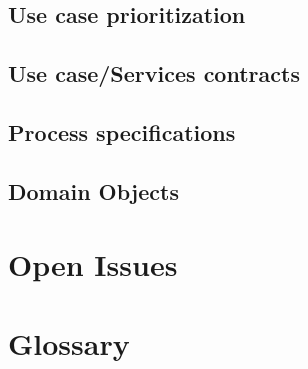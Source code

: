 \documentclass[12pt]{article}
\begin{document}
 \subsection{Use case prioritization}
 \subsection{Use case/Services contracts}
 \subsection{Process specifications}
 \subsection{Domain Objects}
 \section{Open Issues}
 \section{Glossary} 
\end{document}
